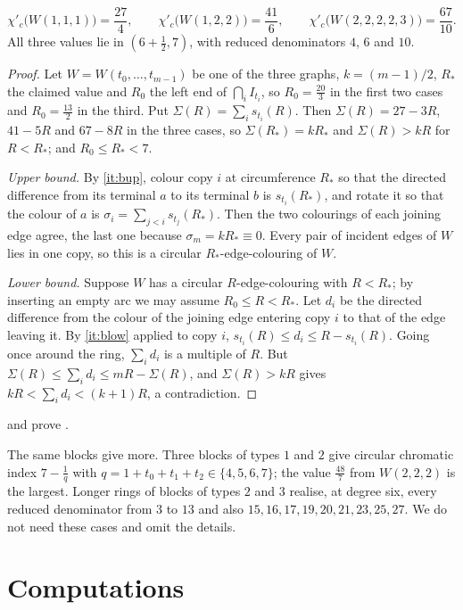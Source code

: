 \documentclass[11pt,colorlinks]{charlie}
\newcommand{\cind}{\chi'_c}
\begin{document}
\begin{theorem}\label{thm:rings}
\[
\cind\bigl(W(1,1,1)\bigr)=\frac{27}{4},\qquad\cind\bigl(W(1,2,2)\bigr)=\frac{41}{6},\qquad\cind\bigl(W(2,2,2,2,3)\bigr)=\frac{67}{10}.
\]
All three values lie in $(6+\frac12,7)$, with reduced denominators $4$, $6$ and $10$.
\end{theorem}

\begin{proof}
Let $W=W(t_0,\dots,t_{m-1})$ be one of the three graphs, $k=(m-1)/2$, $R_*$ the claimed value and $R_0$ the left end of $\bigcap_iI_{t_i}$, so $R_0=\frac{20}{3}$ in the first two cases and $R_0=\frac{13}{2}$ in the third. Put $\Sigma(R)=\sum_is_{t_i}(R)$. Then $\Sigma(R)=27-3R$, $41-5R$ and $67-8R$ in the three cases, so $\Sigma(R_*)=kR_*$ and $\Sigma(R)>kR$ for $R<R_*$; and $R_0\le R_*<7$.

\emph{Upper bound.} By \ref{it:bup}, colour copy $i$ at circumference $R_*$ so that the directed difference from its terminal $a$ to its terminal $b$ is $s_{t_i}(R_*)$, and rotate it so that the colour of $a$ is $\sigma_i=\sum_{j<i}s_{t_j}(R_*)$. Then the two colourings of each joining edge agree, the last one because $\sigma_m=kR_*\equiv0$. Every pair of incident edges of $W$ lies in one copy, so this is a circular $R_*$-edge-colouring of $W$.

\emph{Lower bound.} Suppose $W$ has a circular $R$-edge-colouring with $R<R_*$; by inserting an empty arc we may assume $R_0\le R<R_*$. Let $d_i$ be the directed difference from the colour of the joining edge entering copy $i$ to that of the edge leaving it. By \ref{it:blow} applied to copy $i$, $s_{t_i}(R)\le d_i\le R-s_{t_i}(R)$. Going once around the ring, $\sum_id_i$ is a multiple of $R$. But $\Sigma(R)\le\sum_id_i\le mR-\Sigma(R)$, and $\Sigma(R)>kR$ gives $kR<\sum_id_i<(k+1)R$, a contradiction.
\end{proof}

 and  prove .

The same blocks give more. Three blocks of types $1$ and $2$ give circular chromatic index $7-\frac1q$ with $q=1+t_0+t_1+t_2\in\{4,5,6,7\}$; the value $\frac{48}{7}$ from $W(2,2,2)$ is the largest. Longer rings of blocks of types $2$ and $3$ realise, at degree six, every reduced denominator from $3$ to $13$ and also $15,16,17,19,20,21,23,25,27$. We do not need these cases and omit the details.

\section{Computations}\label{sec:computations}
\end{document}

